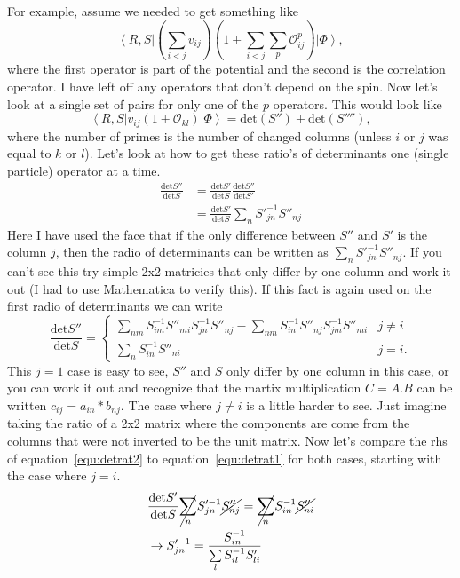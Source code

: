 \documentclass[12pt]{extarticle}
\newcommand{\Okl}{\mathcal{O}_{kl}}
\newcommand{\Oijp}{\mathcal{O}^p_{ij}}
\newcommand{\ket}[1]{\left| #1 \right>}
\newcommand{\bra}[1]{\left< #1 \right|}
\newcommand{\detr}{\mathrm{det}}
\begin{document}
For example, assume we needed to get something like
\begin{equation}
  \bra{R,S}(\sum_{i<j}v_{ij})(1+\sum_{i<j}\sum_p \Oijp) \ket{\Phi},
\end{equation}
where the first operator is part of the potential and the second is the correlation operator. I have left off any operators that don't depend on the spin. Now let's look at a single set of pairs for only one of the $p$ operators. This would look like
\begin{equation}
  \bra{R,S} v_{ij}(1+\Okl) \ket{\Phi} = \mathrm{det}(S'') + \mathrm{det}(S''''),
\end{equation}
where the number of primes is the number of changed columns (unless $i$ or $j$ was equal to $k$ or $l$). Let's look at how to get these ratio's of determinants one (single particle) operator at a time.
\begin{align}
  \frac{\mathrm{det}S''}{\mathrm{det}S} &= \frac{\detr S'}{\detr S}\frac{\detr S''}{\detr S'} \\
  &= \frac{\detr S'}{\detr S}\sum_n S'^{-1}_{jn}S''_{nj} \label{equ:detrat1}
\end{align}
Here I have used the face that if the only difference between $S''$ and $S'$ is the column $j$, then the radio of determinants can be written as $\sum_n S'^{-1}_{jn}S''_{nj}$. If you can't see this try simple 2x2 matricies that only differ by one column and work it out (I had to use Mathematica to verify this). If this fact is again used on the first radio of determinants we can write
\begin{equation}
  \frac{\mathrm{det}S''}{\mathrm{det}S} = \begin{cases}
  \sum_{nm} S^{-1}_{im}S''_{mi}S^{-1}_{jn}S''_{nj} - \sum_{nm}S^{-1}_{in}S''_{nj}S^{-1}_{jm}S''_{mi} & j \neq i \\
  \sum_n S^{-1}_{in}S''_{ni} & j = i.
  \end{cases}
  \label{equ:detrat2}
\end{equation}
This $j=1$ case is easy to see, $S''$ and $S$ only differ by one column in this case, or you can work it out and recognize that the martix multiplication $C=A.B$ can be written $c_{ij} = a_{in}*b_{nj}$. The case where $j \neq i$ is a little harder to see. Just imagine taking the ratio of a 2x2 matrix where the components are come from the columns that were not inverted to be the unit matrix. Now let's compare the rhs of equation~\ref{equ:detrat2} to equation~\ref{equ:detrat1} for both cases, starting with the case where $j=i$.
\begin{align}
  &\frac{\detr S'}{\detr S}\cancel{\sum_n} S'^{-1}_{jn}\cancel{S''_{nj}} = \cancel{\sum_n} S^{-1}_{in}\cancel{S''_{ni}} \\
  &\rightarrow S'^{-1}_{jn} = \frac{S^{-1}_{in}}{\sum\limits_l S^{-1}_{il}S'_{li}}
\end{align}
\end{document}
